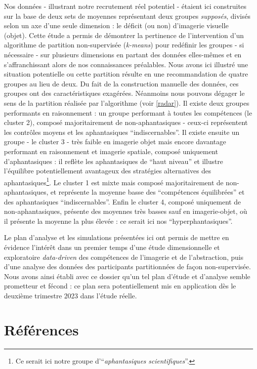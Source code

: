 \documentclass[
  12pt,
]{article}
\begin{document}
Nos données - illustrant notre recrutement réel potentiel - étaient ici
construites sur la base de deux sets de moyennes représentant deux
groupes \emph{supposés}, divisés selon un axe d'une seule dimension : le
déficit (ou non) d'imagerie visuelle (objet). Cette étude a permis de
démontrer la pertinence de l'intervention d'un algorithme de partition
non-supervisée (\emph{k-means}) pour redéfinir les groupes - si
nécessaire - sur plusieurs dimensions en partant des données elles-mêmes
et en s'affranchissant alors de nos connaissances préalables. Nous avons
ici illustré une situation potentielle ou cette partition résulte en une
recommandation de quatre groupes au lieu de deux. Du fait de la
construction manuelle des données, ces groupes ont des caractéristiques
exagérées. Néanmoins nous pouvons dégager le sens de la partition
réalisée par l'algorithme (voir \autoref{radar}). Il existe deux groupes
performants en raisonnement : un groupe performant à toutes les
compétences (le cluster 2), composé majoritairement de non-aphantasiques
- ceux-ci représentent les contrôles moyens et les aphantasiques
``indiscernables''. Il existe ensuite un groupe - le cluster 3 - très
faible en imagerie objet mais encore davantage performant en
raisonnement et imagerie spatiale, composé uniquement d'aphantasiques :
il reflète les aphantasiques de ``haut niveau'' et illustre l'équilibre
potentiellement avantageux des stratégies alternatives des
aphantasiques\footnote{Ce serait ici notre groupe
  d'``\emph{aphantasiques scientifiques}''.}. Le cluster 1 est mixte
mais composé majoritairement de non-aphantasiques, et représente la
moyenne basse des ``compétences équilibrées'' et des aphantasiques
``indiscernables''. Enfin le cluster 4, composé uniquement de
non-aphantasiques, présente des moyennes très basses sauf en
imagerie-objet, où il présente la moyenne la plus élevée : ce serait ici
nos ``hyperphantasiques''.

Le plan d'analyse et les simulations présentées ici ont permis de mettre
en évidence l'intérêt dans un premier temps d'une étude dimensionnelle
et exploratoire \emph{data-driven} des compétences de l'imagerie et de
l'abstraction, puis d'une analyse des données des participants
partitionnées de façon non-supervisée. Nous avons ainsi établi avec ce
dossier qu'un tel plan d'étude et d'analyse semble prometteur et fécond
: ce plan sera potentiellement mis en application dès le deuxième
trimestre 2023 dans l'étude réelle.

\newpage

\hypertarget{ruxe9fuxe9rences}{%
\section*{Références}\label{ruxe9fuxe9rences}}
\end{document}
